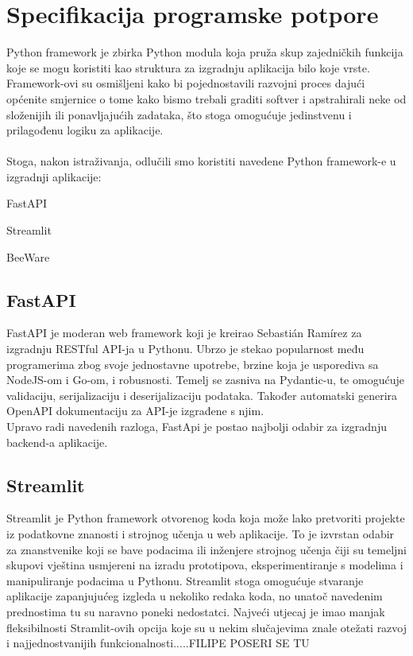 \chapter{Specifikacija programske potpore}
	Python framework je zbirka Python modula koja pruža skup zajedničkih funkcija koje se mogu koristiti kao struktura za izgradnju aplikacija bilo koje vrste.\\
	Framework-ovi su osmišljeni kako bi pojednostavili razvojni proces dajući općenite smjernice o tome kako bismo trebali graditi softver i apstrahirali neke od složenijih ili ponavljajućih zadataka, što stoga omogućuje jedinstvenu i prilagođenu logiku za aplikacije.\\
	\\
	Stoga, nakon istraživanja, odlučili smo koristiti navedene Python framework-e u izgradnji aplikacije:

	\begin{packed_enum}

		\item FastAPI
		\item Streamlit
		\item BeeWare

	\end{packed_enum}

	\bigskip

	\section{FastAPI}

	FastAPI je moderan web framework koji je kreirao Sebastián Ramírez za izgradnju RESTful API-ja u Pythonu. Ubrzo je stekao popularnost među programerima zbog svoje jednostavne upotrebe, brzine koja je usporediva sa NodeJS-om i Go-om, i robusnosti. Temelj se zasniva na Pydantic-u, te omogućuje validaciju, serijalizaciju i deserijalizaciju podataka. Također automatski generira OpenAPI dokumentaciju za API-je izgrađene s njim.\\
	Upravo radi navedenih razloga, FastApi je postao najbolji odabir za izgradnju backend-a aplikacije.

	\bigskip

	\section{Streamlit}

	Streamlit je Python framework otvorenog koda koja može lako pretvoriti projekte iz podatkovne znanosti i strojnog učenja u web aplikacije. To je izvrstan odabir za znanstvenike koji se bave podacima ili inženjere strojnog učenja čiji su temeljni skupovi vještina usmjereni na izradu prototipova, eksperimentiranje s modelima i manipuliranje podacima u Pythonu. Streamlit stoga omogućuje stvaranje aplikacije zapanjujućeg izgleda u nekoliko redaka koda, no unatoč navedenim prednostima tu su naravno poneki nedostatci. Najveći utjecaj je imao manjak fleksibilnosti Stramlit-ovih opcija koje su u nekim slučajevima znale otežati razvoj i najjednostvanijih funkcionalnosti.....FILIPE POSERI SE TU


